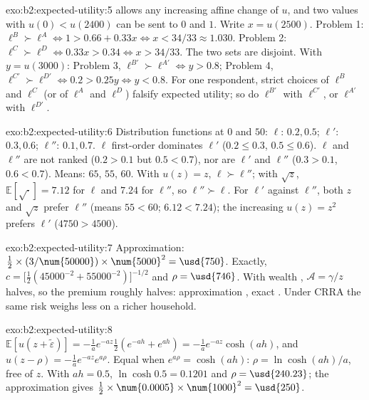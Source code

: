 \begin{solution}{exo:b2:expected-utility:5}
 allows any increasing affine change of $u$, and two values with
$u(0) < u(\num{2400})$ can be sent to $0$ and $1$. Write $x = u(\num{2500})$. Problem 1: $\ell^{B}
\succ \ell^{A} \iff 1 > 0.66 + 0.33x \iff x < 34/33 \approx 1.030$. Problem 2: $\ell^{C} \succ \ell^{D}
\iff 0.33x > 0.34 \iff x > 34/33$. The two sets are disjoint. With $y = u(\num{3000})$: Problem 3,
$\ell^{B'} \succ \ell^{A'} \iff y > 0.8$; Problem 4, $\ell^{C'} \succ \ell^{D'} \iff 0.2 > 0.25y \iff y <
0.8$. For one respondent, strict choices of $\ell^{B}$ and $\ell^{C}$ (or of $\ell^{A}$ and $\ell^{D}$)
falsify expected utility; so do $\ell^{B'}$ with $\ell^{C'}$, or $\ell^{A'}$ with $\ell^{D'}$.
\end{solution}

\begin{solution}{exo:b2:expected-utility:6}
Distribution functions at $0$ and $50$: $\ell$: $0.2, 0.5$; $\ell'$: $0.3, 0.6$; $\ell''$: $0.1, 0.7$.
$\ell$ first-order dominates $\ell'$ ($0.2 \le 0.3$, $0.5 \le 0.6$). $\ell$ and $\ell''$ are not ranked
($0.2 > 0.1$ but $0.5 < 0.7$), nor are $\ell'$ and $\ell''$ ($0.3 > 0.1$, $0.6 < 0.7$). Means: $65$,
$55$, $60$. With $u(z) = z$, $\ell \succ \ell''$; with $\sqrt z$, $\mathbb{E}[\sqrt{\cdot}] = 7.12$ for
$\ell$ and $7.24$ for $\ell''$, so $\ell'' \succ \ell$. For $\ell'$ against $\ell''$, both $z$ and
$\sqrt z$ prefer $\ell''$ (means $55 < 60$; $6.12 < 7.24$); the increasing $u(z) = z^2$ prefers
$\ell'$ ($\num{4750} > \num{4500}$).
\end{solution}

\begin{solution}{exo:b2:expected-utility:7}
Approximation: $\tfrac12 \times (3/\num{50000}) \times \num{5000}^2 = \usd{750}$. Exactly, $c =
\bigl[\tfrac12(\num{45000}^{-2} + \num{55000}^{-2})\bigr]^{-1/2}$ and $\rho = \usd{746}$. With wealth
, $\mathcal{A} = \gamma/z$ halves, so the premium roughly halves: approximation ,
exact . Under CRRA the same risk weighs less on a richer household.
\end{solution}

\begin{solution}{exo:b2:expected-utility:8}
$\mathbb{E}[u(z + \tilde\varepsilon)] = -\tfrac{1}{a}e^{-az}\tfrac12(e^{-ah} + e^{ah}) =
-\tfrac{1}{a}e^{-az}\cosh(ah)$, and $u(z - \rho) = -\tfrac1a e^{-az}e^{a\rho}$. Equal when $e^{a\rho} =
\cosh(ah)$: $\rho = \ln\cosh(ah)/a$, free of $z$. With $ah = 0.5$, $\ln\cosh 0.5 = 0.1201$ and $\rho =
\usd{240.23}$; the approximation gives $\tfrac12 \times \num{0.0005} \times \num{1000}^2 = \usd{250}$.
\end{solution}

